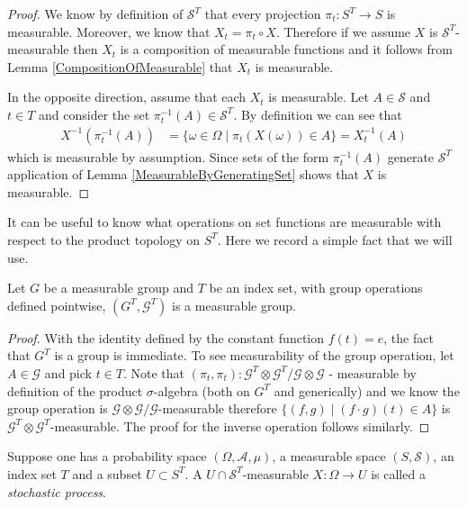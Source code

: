 \begin{proof}
We know by definition of $\mathcal{S}^T$ that every projection $\pi_t
: S^T \to S$ is measurable.  Moreover, we know that $X_t = \pi_t \circ
X$.  Therefore if we assume $X$ is
$\mathcal{S}^T$-measurable then $X_t$ is a composition of measurable
functions and it follows from Lemma
\ref{CompositionOfMeasurable} that $X_t$ is measurable.

In the opposite direction, assume that each $X_t$ is measurable.  Let
$A \in \mathcal{S}$ and $t \in T$ and consider the set $\pi_t^{-1}(A)
\in \mathcal{S}^T$.  By definition we can see that
\begin{align*}
X^{-1}(\pi_t^{-1}(A)) &= \lbrace \omega \in \Omega \mid
\pi_t(X(\omega)) \in A \rbrace = X_t^{-1}(A)
\end{align*}
which is measurable by assumption.  Since sets of the form
$\pi_t^{-1}(A)$ generate $\mathcal{S}^T$ application of Lemma \ref{MeasurableByGeneratingSet}
shows that $X$ is measurable.
\end{proof}

It can be useful to know what operations on set functions are
measurable with respect to the product topology on $S^T$.  Here we
record a simple fact that we will use.
\begin{lem}\label{MeasurableFunctionGroup}Let $G$ be a measurable
  group and $T$ be an index set, with group operations defined pointwise, $(G^T, \mathcal{G}^T)$ is a  measurable group.
\end{lem}
\begin{proof}
With the identity defined by the constant function $f(t) = e$, the
fact that $G^T$ is a group is immediate.  To see measurability of the
group operation, let $A \in \mathcal{G}$ and pick $t \in T$.  Note
that $(\pi_t, \pi_t) : \mathcal{G}^T \otimes \mathcal{G}^T / \mathcal{G} \otimes \mathcal{G}$ - measurable by
definition of the product $\sigma$-algebra (both on $G^T$ and
generically) and we know the group operation is $\mathcal{G} \otimes
\mathcal{G}/\mathcal{G}$-measurable therefore $\lbrace (f,g) \mid (f
\cdot g)(t) \in A \rbrace$ is $\mathcal{G}^T \otimes
\mathcal{G}^T$-measurable.  The proof for the inverse operation
follows similarly.
\end{proof}

\begin{defn}Suppose one has a probability space $(\Omega,
  \mathcal{A}, \mu)$, a measurable space $(S, \mathcal{S})$, an
  index set $T$ and a subset $U \subset S^T$.  A $U \cap
  \mathcal{S}^T$-measurable $X : \Omega \to U$ is called a
  \emph{stochastic process}.
\end{defn}

